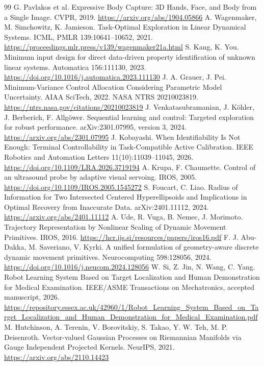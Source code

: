 \documentclass[11pt,a4paper]{article}
\numberwithin{equation}{section}
\theoremstyle{definition}
\begin{document}
\begin{thebibliography}{99}
 G. Pavlakos et al. Expressive Body Capture: 3D Hands, Face, and Body from a Single Image. CVPR, 2019. \url{https://arxiv.org/abs/1904.05866}
 A. Wagenmaker, M. Simchowitz, K. Jamieson. Task-Optimal Exploration in Linear Dynamical Systems. ICML, PMLR 139:10641--10652, 2021. \url{https://proceedings.mlr.press/v139/wagenmaker21a.html}
 S. Kang, K. You. Minimum input design for direct data-driven property identification of unknown linear systems. Automatica 156:111130, 2023. \url{https://doi.org/10.1016/j.automatica.2023.111130}
 J. A. Grauer, J. Pei. Minimum-Variance Control Allocation Considering Parametric Model Uncertainty. AIAA SciTech, 2022. NASA NTRS 20210023819. \url{https://ntrs.nasa.gov/citations/20210023819}
 J. Venkatasubramanian, J. K\"ohler, J. Berberich, F. Allg\"ower. Sequential learning and control: Targeted exploration for robust performance. arXiv:2301.07995, version 3, 2024. \url{https://arxiv.org/abs/2301.07995}
 J. Kobayashi. When Identifiability Is Not Enough: Terminal Controllability in Task-Compatible Active Calibration. IEEE Robotics and Automation Letters 11(10):11039--11045, 2026. \url{https://doi.org/10.1109/LRA.2026.3719194}
 A. Krupa, F. Chaumette. Control of an ultrasound probe by adaptive visual servoing. IROS, 2005. \url{https://doi.org/10.1109/IROS.2005.1545272}
 S. Foucart, C. Liao. Radius of Information for Two Intersected Centered Hyperellipsoids and Implications in Optimal Recovery from Inaccurate Data. arXiv:2401.11112, 2024. \url{https://arxiv.org/abs/2401.11112}
 A. Ude, R. Vuga, B. Nemec, J. Morimoto. Trajectory Representation by Nonlinear Scaling of Dynamic Movement Primitives. IROS, 2016. \url{https://hcr.ijs.si/resources/papers/iros16.pdf}
 F. J. Abu-Dakka, M. Saveriano, V. Kyrki. A unified formulation of geometry-aware discrete dynamic movement primitives. Neurocomputing 598:128056, 2024. \url{https://doi.org/10.1016/j.neucom.2024.128056}
 W. Si, Z. Jin, N. Wang, C. Yang. Robot Learning System Based on Target Localization and Human Demonstration for Medical Examination. IEEE/ASME Transactions on Mechatronics, accepted manuscript, 2026. \url{https://repository.essex.ac.uk/42960/1/Robot_Learning_System_Based_on_Target_Localization_and_Human_Demonstration_for_Medical_Examination.pdf}
 M. Hutchinson, A. Terenin, V. Borovitskiy, S. Takao, Y. W. Teh, M. P. Deisenroth. Vector-valued Gaussian Processes on Riemannian Manifolds via Gauge Independent Projected Kernels. NeurIPS, 2021. \url{https://arxiv.org/abs/2110.14423}
\end{thebibliography}
\end{document}
